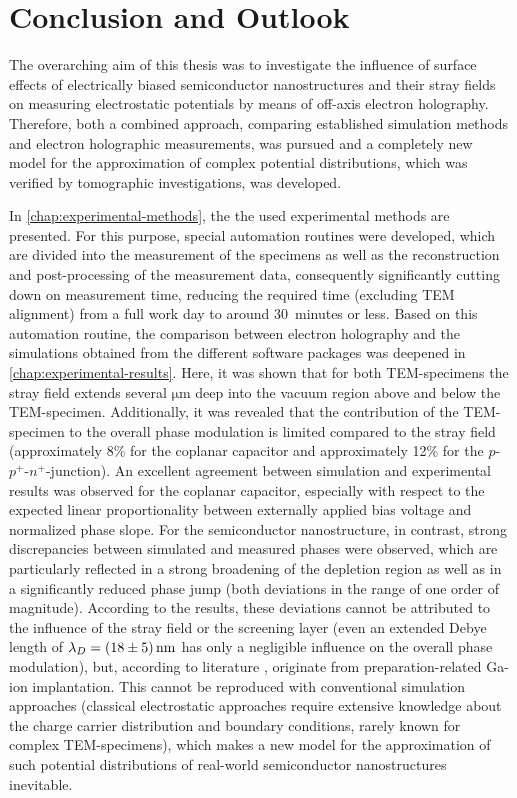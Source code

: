 \chapter{Conclusion and Outlook} \label{chap:Conclusion}
The overarching aim of this thesis was to investigate the influence of surface effects of electrically biased semiconductor nanostructures and their stray fields on measuring electrostatic potentials by means of off-axis electron holography. Therefore, both a combined approach, comparing established simulation methods and electron holographic measurements, was pursued and a completely new model for the approximation of complex potential distributions, which was verified by tomographic investigations, was developed.

In \cref{chap:experimental-methods}, the the used experimental methods are presented. For this purpose, special automation routines were developed, which are divided into the measurement of the specimens as well as the reconstruction and post-processing of the measurement data, consequently significantly cutting down on measurement time, reducing the required time (excluding TEM alignment) from a full work day to around 30~minutes or less. Based on this automation routine, the comparison between electron holography and the simulations obtained from the different software packages was deepened in \cref{chap:experimental-results}. Here, it was shown that for both TEM-specimens the stray field extends several $\si{\um}$ deep into the vacuum region above and below the TEM-specimen. Additionally, it was revealed that the contribution of the TEM-specimen to the overall phase modulation is limited compared to the stray field (approximately 8\% for the coplanar capacitor and approximately 12\% for the $p$-$p^+$-$n^+$-junction). An excellent agreement between simulation and experimental results was observed for the coplanar capacitor, especially with respect to the expected linear proportionality between externally applied bias voltage and normalized phase slope. For the semiconductor nanostructure, in contrast, strong discrepancies between simulated and measured phases were observed, which are particularly reflected in a strong broadening of the depletion region as well as in a significantly reduced phase jump (both deviations in the range of one order of magnitude). According to the results, these deviations cannot be attributed to the influence of the stray field or the screening layer (even an extended Debye length of $\lambda_D = \SI{18 \pm 5}{\nm}$ has only a negligible influence on the overall phase modulation), but, according to literature \cite{Twitchett-Harrison2007}, originate from preparation-related Ga-ion implantation. This cannot be reproduced with conventional simulation approaches (classical electrostatic approaches require extensive knowledge about the charge carrier distribution and boundary conditions, rarely known for complex TEM-specimens), which makes a new model for the approximation of such potential distributions of real-world semiconductor nanostructures inevitable.

